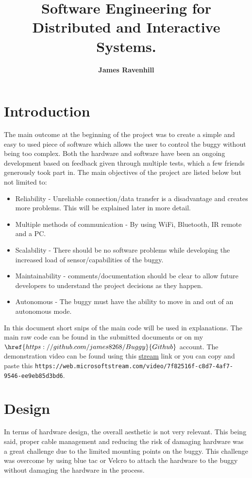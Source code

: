 \documentclass[8pt, a4paper]{article}
\begin{document}
\setlength \topmargin{-1in}
\title{\textbf{Software Engineering for Distributed and Interactive Systems.}}
\author{\textbf{James Ravenhill}}
\date{}
\maketitle

\section{Introduction} 

The main outcome at the beginning of the project was to create a simple and easy to used piece of software which allows the user to control the buggy without being too complex. Both the hardware and software have been an ongoing development based on feedback given through multiple tests, which a few friends generously took part in. The main objectives of the project are listed below but not limited to:

\begin{itemize}
	\item Reliability - Unreliable connection/data transfer is a disadvantage and creates more problems. This will be explained later in more detail.  
	\item  Multiple methods of communication - By using WiFi, Bluetooth, IR remote and a PC. 
	\item Scalability - There should be no software problems while developing the increased load of sensor/capabilities of the buggy. 
	\item Maintainability - comments/documentation should be clear to allow future developers to understand the project decisions as they happen. 
	\item Autonomous - The buggy must have the ability to move in and out of an autonomous mode.  
\end{itemize}

In this document short snips of the main code will be used in explanations. The main raw code can be found in the submitted documents or on my $\href{https://github.com/james8268/Buggy}{Github}$ account. The demonstration video can be found using this \href{https://web.microsoftstream.com/video/7f82516f-c8d7-4af7-9546-ee9eb85d3bd6}{stream} link or you can copy and paste this \verb|https://web.microsoftstream.com/video/7f82516f-c8d7-4af7-9546-ee9eb85d3bd6|.
 

\section{Design}
In terms of hardware design, the overall aesthetic is not very relevant. This being said, proper cable management and reducing the risk of damaging hardware was a great challenge due to the limited mounting points on the buggy. This challenge was overcome by using blue tac or Velcro to attach the hardware to the buggy without damaging the hardware in the process. 
\end{document}
